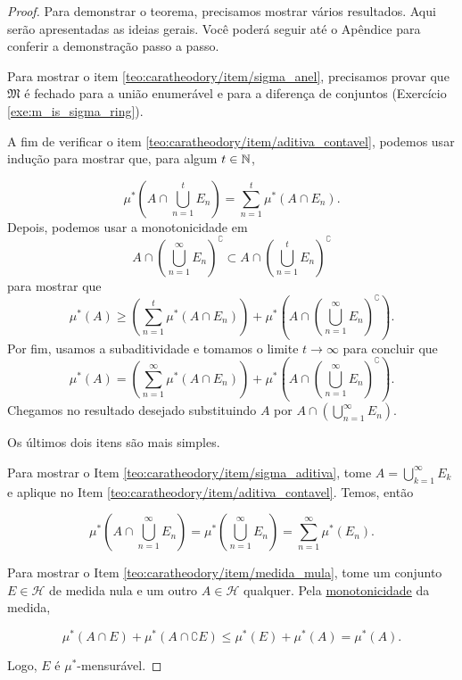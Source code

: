 \begin{proof}
    Para demonstrar o teorema, precisamos mostrar vários resultados. Aqui serão apresentadas as ideias gerais. Você poderá seguir até o Apêndice para conferir a demonstração passo a passo.
    
    Para mostrar o item \ref{teo:caratheodory/item/sigma_anel}, precisamos provar que $\mathfrak{M}$ é fechado para a união enumerável e para a diferença de conjuntos (Exercício \ref{exe:m_is_sigma_ring}).
    
    A fim de verificar o item \ref{teo:caratheodory/item/aditiva_contavel}, podemos usar indução para mostrar que, para algum $t\in\mathbb{N}$,
    
    \begin{equation*}
        \mu^{*}\left(A\cap \bigcup_{n=1}^{t} E_n \right) = \sum_{n=1}^{t} \mu^{*}\left(A\cap E_n\right).
    \end{equation*}
    Depois, podemos usar a monotonicidade em 
    \begin{equation*}
        A\cap\left(\bigcup_{n=1}^{\infty} E_n\right)^{\complement}\subset A\cap\left(\bigcup_{n=1}^{t} E_n\right)^{\complement}
    \end{equation*}
    para mostrar que 
    \begin{equation*}
        \mu^{*}(A)\geq\left(\sum_{n=1}^{t}\mu^{*}(A\cap E_n)\right) + \mu^{*}\left(A\cap\left(\bigcup_{n=1}^{\infty} E_n\right)^{\complement}\right).
    \end{equation*}
    Por fim, usamos a subaditividade e tomamos o limite $t\rightarrow \infty$ para concluir que
    \begin{equation*}
        \mu^{*}(A) =\left(\sum_{n=1}^{\infty}\mu^{*}(A\cap E_n)\right) + \mu^{*}\left(A\cap\left(\bigcup_{n=1}^{\infty} E_n\right)^{\complement}\right).
    \end{equation*}
    Chegamos no resultado desejado substituindo $A$ por $A\cap\left(\bigcup_{n=1}^{\infty} E_n\right)$.
    
    Os últimos dois itens são mais simples.

    Para mostrar o Item \ref{teo:caratheodory/item/sigma_aditiva}, tome $A=\bigcup_{k=1}^{\infty} E_k$ e aplique no Item \ref{teo:caratheodory/item/aditiva_contavel}. Temos, então

    \begin{equation*}
        \mu^{*}\left(A\cap \bigcup_{n=1}^{\infty} E_n \right) = \mu^{*}\left(\bigcup_{n=1}^{\infty} E_n \right) = \sum_{n=1}^{\infty} \mu^{*}\left(E_n\right).
    \end{equation*}

    Para mostrar o Item \ref{teo:caratheodory/item/medida_mula}, tome um conjunto $E\in\mathcal{H}$ de medida nula e um outro $A\in\mathcal{H}$ qualquer. Pela \hyperref[prop:measure_is_monotonic]{monotonicidade} da medida,

    \begin{equation*}
        \mu^*(A\cap E) + \mu^*(A\cap \complement E) \leq \mu^*(E) + \mu^*(A) = \mu^*(A).
    \end{equation*}

    Logo, $E$ é $\mu^*$-mensurável.
    \end{proof}